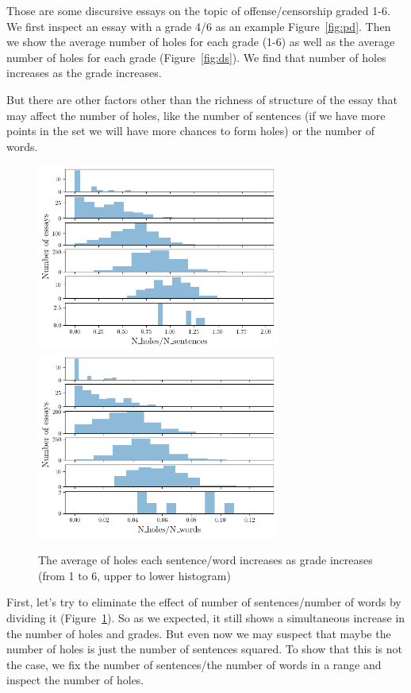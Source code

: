 

Those are some discursive essays on the topic of offense/censorship graded 1-6. We first inspect
an essay with a grade 4/6 as an example Figure~\ref{fig:pd}. Then we show
the average number of holes for each grade (1-6)
as well as the average number of holes for each grade (Figure~\ref{fig:ds}).
We find that number of holes increases as the grade increases.

But there are other factors other than the richness of structure of the essay that may affect
the number of holes, like the number of sentences (if we have more points in the set
we will have more chances to form holes) or the number of words.

\begin{figure}[H]
  \includegraphics[width=8cm]{gradesah1s.png}
  \includegraphics[width=8cm]{gradesah1w.png}
  \caption{The average of holes each sentence/word increases as grade increases (from 1 to 6, upper to lower histogram)}
  \label{fig:ads}
\end{figure}

First, let's try to eliminate the effect of number of sentences/number of words
by dividing it (Figure~\ref{fig:ads}). So as we expected, it still shows a simultaneous
increase in the number of holes and grades. But even now we may suspect that
maybe the number of holes is just the number of sentences squared. To show that
this is not the case, we fix the number of sentences/the number of words in a range
and inspect the number of holes.

